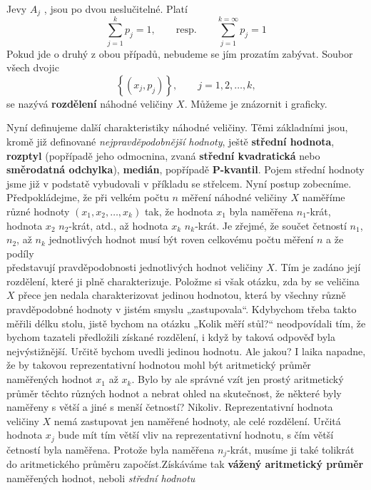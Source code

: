     Jevy \(A_j\) , jsou po dvou neslučitelné. Platí
    \begin{equation*}
      \sum_{j=1}^{k}p_j = 1, \qquad\text{resp.}\qquad \sum_{j=1}^{k=\infty}p_j = 1
    \end{equation*}
    Pokud jde o druhý z obou případů, nebudeme se jím prozatím zabývat. Soubor všech dvojic
    \begin{equation*}
      \left\lbrace(x_j, p_j)\right\rbrace,\qquad j = 1, 2, \ldots, k,
    \end{equation*}
    se nazývá \textbf{rozdělení} náhodné veličiny \(X\). Můžeme je znázornit i graficky.

    
    
    Nyní definujeme další charakteristiky náhodné veličiny. Těmi základními jsou, kromě již 
    definované \emph{nejpravděpodobnější hodnoty}, ještě \textbf{střední hodnota}, \textbf{rozptyl} 
    (popřípadě jeho odmocnina, zvaná \textbf{střední kvadratická} nebo \textbf{směrodatná 
    odchylka}), \textbf{medián}, popřípadě \textbf{P-kvantil}. Pojem střední hodnoty jsme již v 
    podstatě vybudovali v příkladu se střelcem. Nyní postup zobecníme. Předpokládejme, že při 
    velkém počtu \(n\) měření náhodné veličiny \(X\) naměříme různé hodnoty \((x_1, x_2, \ldots, 
    x_k)\) tak, že hodnota \(x_1\) byla naměřena \(n_1\)-krát, hodnota \(x_2\) \(n_2\)-krát, atd., 
    až hodnota \(x_k\) \(n_k\)-krát. Je zřejmé, že součet četností \(n_1\), \(n_2\), až \(n_k\) 
    jednotlivých hodnot musí být roven celkovému počtu měření \(n\) a že podíly
    \begin{equation*}
    \end{equation*}
    představují pravděpodobnosti jednotlivých hodnot veličiny \(X\). Tím je zadáno její rozdělení,
    které ji plně charakterizuje. Položme si však otázku, zda by se veličina \(X\) přece jen nedala
    charakterizovat jedinou hodnotou, která by všechny různě pravděpodobné hodnoty v jistém
    smyslu „zastupovala“. Kdybychom třeba takto měřili délku stolu, jistě bychom na otázku „Kolik
    měří stůl?“ neodpovídali tím, že bychom tazateli předložili získané rozdělení, i když by taková
    odpověď byla nejvýstižnější. Určitě bychom uvedli jedinou hodnotu. Ale jakou? I laika napadne,
    že by takovou reprezentativní hodnotou mohl být aritmetický průměr naměřených hodnot \(x_1\) až
    \(x_k\). Bylo by ale správné vzít jen prostý aritmetický průměr těchto různých hodnot a nebrat 
    ohled na skutečnost, že některé byly naměřeny s větší a jiné s menší četností? Nikoliv. 
    Reprezentativní hodnota veličiny \(X\) nemá zastupovat jen naměřené hodnoty, ale celé 
    rozdělení. Určitá hodnota \(x_j\) bude mít tím větší vliv na reprezentativní hodnotu, s čím 
    větší četností byla naměřena. Protože byla naměřena \(n_j\)-krát, musíme ji také tolikrát do 
    aritmetického průměru započíst.Získáváme tak \textbf{vážený aritmetický průměr} naměřených 
    hodnot, neboli \emph{střední hodnotu}
    
